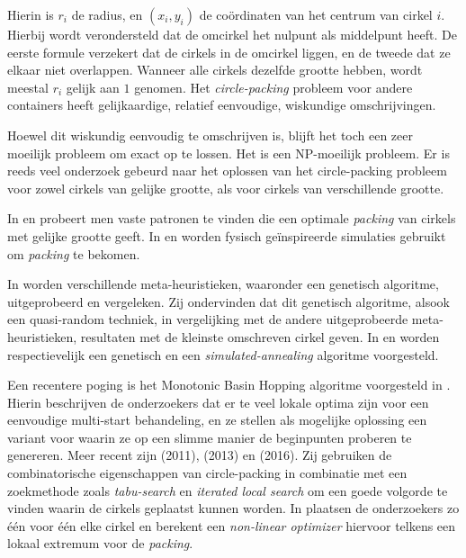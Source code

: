 \documentclass[12pt,a4paper,oneside]{book}
\begin{document}
Hierin is $r_i$ de radius, en $(x_i,y_i)$ de coördinaten van het centrum van cirkel $i$.
Hierbij wordt verondersteld dat de omcirkel het nulpunt als middelpunt heeft.
De eerste formule verzekert dat de cirkels in de omcirkel liggen, en de tweede dat ze elkaar niet overlappen.
Wanneer alle cirkels dezelfde grootte hebben, wordt meestal $r_i$ gelijk aan $1$ genomen.
Het \textit{circle-packing} probleem voor andere containers heeft gelijkaardige, relatief eenvoudige, wiskundige omschrijvingen.

Hoewel dit wiskundig eenvoudig te omschrijven is, blijft het toch een zeer moeilijk probleem om exact op te lossen.
Het is een NP-moeilijk probleem. Er is reeds veel onderzoek gebeurd naar het oplossen van het circle-packing probleem voor zowel cirkels van gelijke grootte, als voor cirkels van verschillende grootte.

In \cite{graham1996repeated} en \cite{lubachevsky1997curved} probeert men vaste patronen te vinden die een optimale \textit{packing} van cirkels met gelijke grootte geeft.
In \cite{graham1998dense} en \cite{wang2002improved} worden fysisch geïnspireerde simulaties gebruikt om \textit{packing} te bekomen.

In \cite{george1995packing} worden verschillende meta-heuristieken, waaronder een genetisch algoritme, uitgeprobeerd en vergeleken.
Zij ondervinden dat dit genetisch algoritme, alsook een quasi-random techniek, in vergelijking met de andere uitgeprobeerde meta-heuristieken, resultaten met de kleinste omschreven cirkel geven.
In \cite{hifi2004approximate} en \cite{hifi2004simulated} worden respectievelijk een genetisch en een \textit{simulated-annealing} algoritme voorgesteld.

Een recentere poging is het Monotonic Basin Hopping algoritme voorgesteld in \cite{grosso2010}.
Hierin beschrijven de onderzoekers dat er te veel lokale optima zijn voor een eenvoudige multi-start behandeling, en ze stellen als mogelijke oplossing een variant voor waarin ze op een slimme manier de beginpunten proberen te genereren.
Meer recent zijn \cite{jors2011} (2011), \cite{ye2013iterated} (2013) en \cite{zeng2016iterated} (2016).
Zij gebruiken de combinatorische eigenschappen van circle-packing in combinatie met een zoekmethode zoals \textit{tabu-search} en \textit{iterated local search} om een goede volgorde te vinden waarin de cirkels geplaatst kunnen worden.
In \cite{jors2011} plaatsen de onderzoekers zo één voor één elke cirkel en berekent een \textit{non-linear optimizer} hiervoor telkens een lokaal extremum voor de \textit{packing}.
\end{document}
